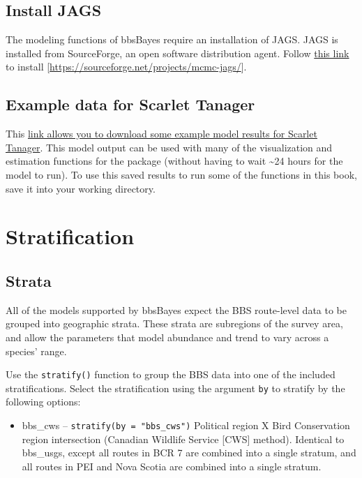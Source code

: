 \documentclass[
]{book}
\providecommand{\tightlist}{%
  \setlength{\itemsep}{0pt}\setlength{\parskip}{0pt}}
\begin{document}
\hypertarget{install-jags}{%
\section{Install JAGS}\label{install-jags}}

The modeling functions of bbsBayes require an installation of JAGS. JAGS is installed from SourceForge, an open software distribution agent. Follow \href{https://sourceforge.net/projects/mcmc-jags/}{this link} to install {[}\url{https://sourceforge.net/projects/mcmc-jags/}{]}.

\hypertarget{example-data-for-scarlet-tanager}{%
\section{Example data for Scarlet Tanager}\label{example-data-for-scarlet-tanager}}

This \href{https://drive.google.com/file/d/1LCZrl0W0AEbXj8_MyUP-CXX3a-j77rFN/view?usp=sharing}{link allows you to download some example model results for Scarlet Tanager}. This model output can be used with many of the visualization and estimation functions for the package (without having to wait \textasciitilde24 hours for the model to run). To use this saved results to run some of the functions in this book, save it into your working directory.

\hypertarget{Stratify}{%
\chapter{Stratification}\label{Stratify}}

\hypertarget{strata}{%
\section{Strata}\label{strata}}

All of the models supported by bbsBayes expect the BBS route-level data to be grouped into geographic strata. These strata are subregions of the survey area, and allow the parameters that model abundance and trend to vary across a species' range.

Use the \texttt{stratify()} function to group the BBS data into one of the included stratifications. Select the stratification using the argument \texttt{by} to stratify by the following options:

\begin{itemize}
\tightlist
\item
  bbs\_cws -- \texttt{stratify(by\ =\ "bbs\_cws")} Political region X Bird Conservation region intersection (Canadian Wildlife Service {[}CWS{]} method). Identical to bbs\_usgs, except all routes in BCR 7 are combined into a single stratum, and all routes in PEI and Nova Scotia are combined into a single stratum.
\end{itemize}
\end{document}
